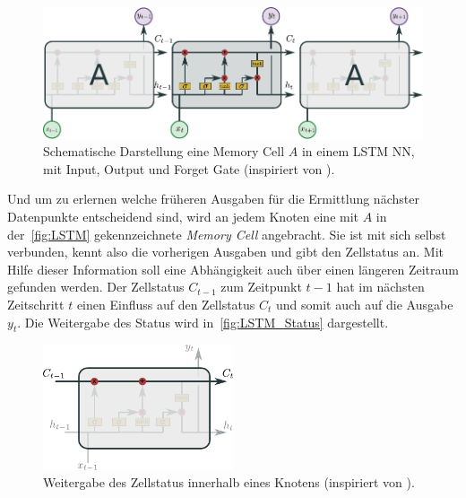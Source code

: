             \begin{figure}[ht]
                \centering
                \includegraphics[width=1\textwidth]{images/Illustrationen/LSTM}
                \caption{Schematische Darstellung eine Memory Cell $A$ in einem LSTM NN, mit Input, Output und Forget Gate (inspiriert von \cite{OLAH2015}).}
                \label{fig:LSTM}
            \end{figure}

            Und um zu erlernen welche früheren Ausgaben für die Ermittlung nächster Datenpunkte entscheidend sind,
            wird an jedem Knoten eine mit $A$ in der~\autoref{fig:LSTM} gekennzeichnete \textit{Memory Cell}  angebracht.
            Sie ist mit sich selbst verbunden, kennt also die vorherigen Ausgaben und gibt den Zellstatus an.
            Mit Hilfe dieser Information soll eine Abhängigkeit auch über einen längeren Zeitraum gefunden werden.
            Der Zellstatus $C_{t-1}$ zum Zeitpunkt $t-1$ hat im nächsten Zeitschritt $t$ einen Einfluss auf den Zellstatus $C_{t}$ und somit auch auf die Ausgabe $y_t$.
            Die Weitergabe des Status wird in~\autoref{fig:LSTM_Status} dargestellt.

                \begin{figure}[ht]
                    \centering
                    \includegraphics[width=0.5\textwidth]{images/Illustrationen/LSTM_MC}
                    \caption{Weitergabe des Zellstatus innerhalb eines Knotens (inspiriert von \cite{OLAH2015}).}
                    \label{fig:LSTM_Status}
                \end{figure}
                
